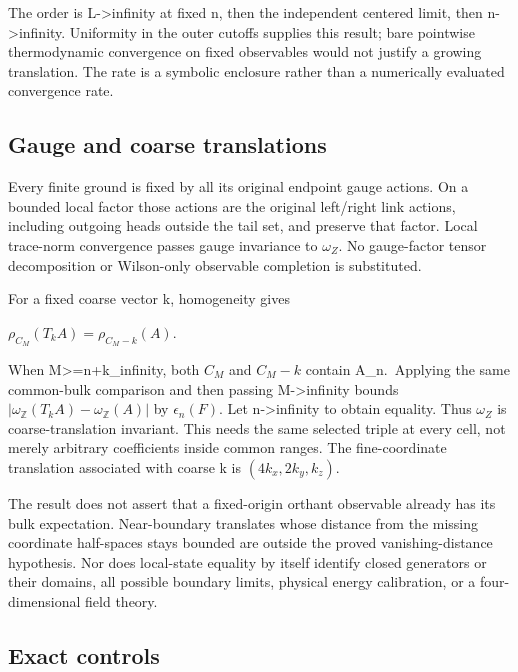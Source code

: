 The order is L-\textgreater infinity at fixed n, then the independent centered limit, then n-\textgreater infinity. Uniformity in the outer cutoffs supplies this result; bare pointwise thermodynamic convergence on fixed observables would not justify a growing translation. The rate is a symbolic enclosure rather than a numerically evaluated convergence rate.

\hypertarget{r29-an2-gauge-and-coarse-translations}{%
\subsection{Gauge and coarse translations}\label{r29:an2:r29-an2-gauge-and-coarse-translations}}

Every finite ground is fixed by all its original endpoint gauge actions. On a bounded local factor those actions are the original left/right link actions, including outgoing heads outside the tail set, and preserve that factor. Local trace-norm convergence passes gauge invariance to \(\omega_Z\). No gauge-factor tensor decomposition or Wilson-only observable completion is substituted.

For a fixed coarse vector k, homogeneity gives

\(\rho_{C_M}(T_kA)=\rho_{C_M-k}(A)\).

When M\textgreater=n+\textbar\textbar k\textbar\textbar\_infinity, both \(C_M\) and \(C_M-k\) contain A\_n.~Applying the same common-bulk comparison and then passing M-\textgreater infinity bounds \(|\omega_{\mathbb Z}(T_kA)-\omega_{\mathbb Z}(A)|\) by \(\epsilon_n(F)\). Let n-\textgreater infinity to obtain equality. Thus \(\omega_Z\) is coarse-translation invariant. This needs the same selected triple at every cell, not merely arbitrary coefficients inside common ranges. The fine-coordinate translation associated with coarse k is \((4k_x,2k_y,k_z)\).

The result does not assert that a fixed-origin orthant observable already has its bulk expectation. Near-boundary translates whose distance from the missing coordinate half-spaces stays bounded are outside the proved vanishing-distance hypothesis. Nor does local-state equality by itself identify closed generators or their domains, all possible boundary limits, physical energy calibration, or a four-dimensional field theory.

\hypertarget{r29-an2-exact-controls}{%
\subsection{Exact controls}\label{r29:an2:r29-an2-exact-controls}}

